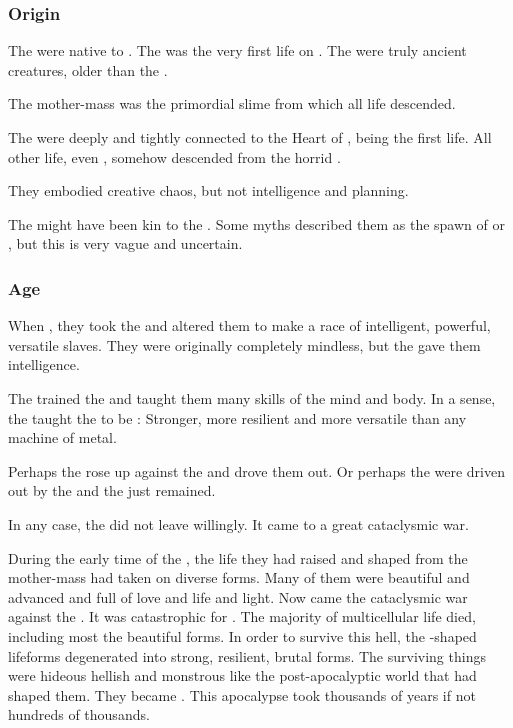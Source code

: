 \subsubsection{Origin}
The \noggyaleth were native to \Miith.
The \noggyal {} was the very first life on \Miith. 
The \noggyaleth were truly ancient creatures, older than the \ophidians.

The mother-mass was the primordial slime from which all \Miithian{} life descended. 

The \noggyaleth were deeply and tightly connected to the Heart of \Miith, being the first life.
All other life, even \ophidians, somehow descended from the horrid \noggyaleth.

They embodied creative chaos, but not intelligence and planning.

The \noggyaleth might have been kin to the \xss.
Some \draconic myths described them as the spawn of \RuinSatha or \KyaethemChreiAz, but this is very vague and uncertain.





\subsubsection{\Voyager Age}
When , they took the \noggyaleth and altered them to make a race of intelligent, powerful, versatile slaves.
They were originally completely mindless, but the \voyagers gave them intelligence.

The \voyagers trained the \noggyaleth and taught them many skills of the mind and body. 
In a sense, the \voyagers taught the \noggyaleth to be :
Stronger, more resilient and more versatile than any machine of metal. 

Perhaps the \noggyaleth rose up against the \voyagers and drove them out.
Or perhaps the \voyagers were driven out by the \xss and the \noggyaleth just remained.

In any case, the \voyagers did not leave willingly. 
It came to a great cataclysmic war. 

During the early time of the \voyagers, the life they had raised and shaped from the mother-mass had taken on diverse forms. 
Many of them were beautiful and advanced and full of love and life and light. 
Now came the cataclysmic war against the \voyagers. 
It was catastrophic for \Miith. 
The majority of multicellular life died, including most the beautiful forms. 
In order to survive this hell, the \voyager-shaped lifeforms degenerated into strong, resilient, brutal forms.
The surviving things were hideous hellish and monstrous like the post-apocalyptic world that had shaped them.
They became \noggyaleth. 
This apocalypse took thousands of years if not hundreds of thousands. 





